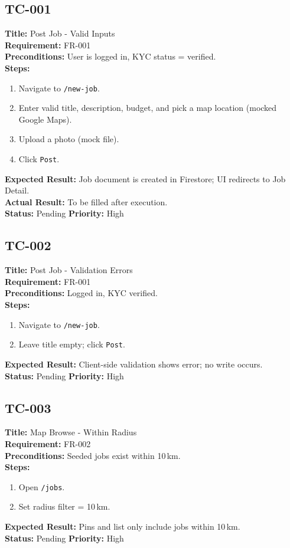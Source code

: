 \documentclass[11pt]{article}
\begin{document}
\subsection*{TC-001}
\textbf{Title:} Post Job - Valid Inputs \\
\textbf{Requirement:} FR-001 \\
\textbf{Preconditions:} User is logged in, KYC status = verified. \\
\textbf{Steps:}
\begin{enumerate}[leftmargin=1.4em]
  \item Navigate to \texttt{/new-job}.
  \item Enter valid title, description, budget, and pick a map location (mocked Google Maps).
  \item Upload a photo (mock file).
  \item Click \texttt{Post}.
\end{enumerate}
\textbf{Expected Result:} Job document is created in Firestore; UI redirects to Job Detail. \\
\textbf{Actual Result:} To be filled after execution. \\
\textbf{Status:} Pending \quad \textbf{Priority:} High

\subsection*{TC-002}
\textbf{Title:} Post Job - Validation Errors \\
\textbf{Requirement:} FR-001 \\
\textbf{Preconditions:} Logged in, KYC verified. \\
\textbf{Steps:}
\begin{enumerate}[leftmargin=1.4em]
  \item Navigate to \texttt{/new-job}.
  \item Leave title empty; click \texttt{Post}.
\end{enumerate}
\textbf{Expected Result:} Client-side validation shows error; no write occurs. \\
\textbf{Status:} Pending \quad \textbf{Priority:} High

\subsection*{TC-003}
\textbf{Title:} Map Browse - Within Radius \\
\textbf{Requirement:} FR-002 \\
\textbf{Preconditions:} Seeded jobs exist within 10\,km. \\
\textbf{Steps:}
\begin{enumerate}[leftmargin=1.4em]
  \item Open \texttt{/jobs}.
  \item Set radius filter = 10\,km.
\end{enumerate}
\textbf{Expected Result:} Pins and list only include jobs within 10\,km. \\
\textbf{Status:} Pending \quad \textbf{Priority:} High
\end{document}
